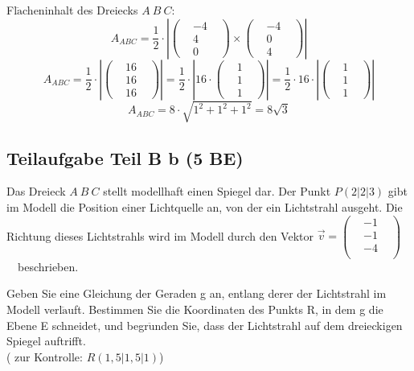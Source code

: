 \documentclass[a4 paper, 12pt]{report}
\theoremstyle{plain}
\begin{document}
Fl$\ddot{\mbox{a}}$cheninhalt des Dreiecks $A~B~C:$
$$
A_{ABC} = \frac{1}{2}\cdot\left|
\begin{pmatrix}
&-4&\\
&4&\\
&0&
\end{pmatrix}
\times
\begin{pmatrix}
&-4&\\
&0&\\
&4&
\end{pmatrix}
\right|
$$
$$
A_{ABC} = \frac{1}{2}\cdot
\left|
\begin{pmatrix}
&16&\\
&16&\\
&16&
\end{pmatrix}
\right|
 = 
\frac{1}{2}
\cdot
\left|16\cdot
\begin{pmatrix}
&1&\\
&1&\\
&1&
\end{pmatrix}
\right|
=\frac{1}{2}\cdot 16\cdot
\left|
\begin{pmatrix}
&1&\\
&1&\\
&1&
\end{pmatrix}
\right|
$$
$$
A_{ABC} = 8\cdot\sqrt{1^2+1^2+1^2} = 8\sqrt{3}
$$
\subsection*{Teilaufgabe Teil B b (5 BE)}

Das Dreieck $A~B~C$ stellt modellhaft einen Spiegel dar. Der Punkt $P(2|2|3)$ gibt im Modell die Position einer Lichtquelle an, von der ein Lichtstrahl ausgeht. Die Richtung dieses
Lichtstrahls wird im Modell durch den Vektor $\stackrel{\longrightarrow}{v} = \begin{pmatrix}
&-1&\\
&-1&\\
&-4&\\
\end{pmatrix}
$ ~~beschrieben.

Geben Sie eine Gleichung der Geraden g an, entlang derer der Lichtstrahl im Modell
verl$\ddot{\mbox{a}}$uft. Bestimmen Sie die Koordinaten des Punkts R, in dem g die Ebene E schneidet,
und begr$\ddot{\mbox{u}}$nden Sie, dass der Lichtstrahl auf dem dreieckigen Spiegel auftrifft.\\
( zur Kontrolle: $R(1,5|1,5|1)$)
\end{document}
